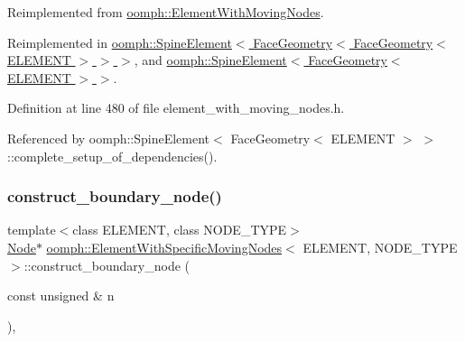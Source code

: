 Reimplemented from \hyperlink{classoomph_1_1ElementWithMovingNodes_a6d2fa178f36d4b8413a9ce4f24e9c87e}{oomph\+::\+Element\+With\+Moving\+Nodes}.



Reimplemented in \hyperlink{classoomph_1_1SpineElement_a867b5e4eb64d60da9585f8a791fbac36}{oomph\+::\+Spine\+Element$<$ Face\+Geometry$<$ Face\+Geometry$<$ E\+L\+E\+M\+E\+N\+T $>$ $>$ $>$}, and \hyperlink{classoomph_1_1SpineElement_a867b5e4eb64d60da9585f8a791fbac36}{oomph\+::\+Spine\+Element$<$ Face\+Geometry$<$ E\+L\+E\+M\+E\+N\+T $>$ $>$}.



Definition at line 480 of file element\+\_\+with\+\_\+moving\+\_\+nodes.\+h.



Referenced by oomph\+::\+Spine\+Element$<$ Face\+Geometry$<$ E\+L\+E\+M\+E\+N\+T $>$ $>$\+::complete\+\_\+setup\+\_\+of\+\_\+dependencies().

\mbox{\label{classoomph_1_1ElementWithSpecificMovingNodes_ab14ba36aafcd7fad826cbb9f8c1eb718}} 
\subsubsection{\texorpdfstring{construct\+\_\+boundary\+\_\+node()}{construct\_boundary\_node()}\hspace{0.1cm}{\footnotesize\ttfamily [1/2]}}
{\footnotesize\ttfamily template$<$class E\+L\+E\+M\+E\+NT, class N\+O\+D\+E\+\_\+\+T\+Y\+PE$>$ \\
\hyperlink{classoomph_1_1Node}{Node}$\ast$ \hyperlink{classoomph_1_1ElementWithSpecificMovingNodes}{oomph\+::\+Element\+With\+Specific\+Moving\+Nodes}$<$ E\+L\+E\+M\+E\+NT, N\+O\+D\+E\+\_\+\+T\+Y\+PE $>$\+::construct\+\_\+boundary\+\_\+node (\begin{DoxyParamCaption}\item[{const unsigned \&}]{n }\end{DoxyParamCaption})\hspace{0.3cm}{\ttfamily [inline]}, {\ttfamily [virtual]}}



